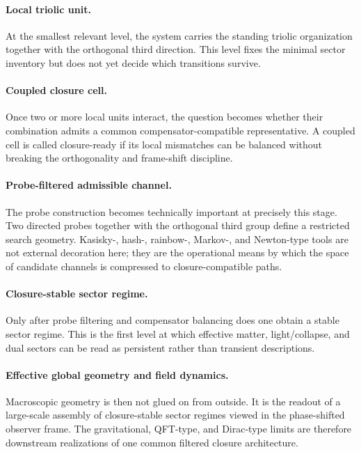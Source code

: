 \paragraph{Local triolic unit.}
At the smallest relevant level, the system carries the standing triolic
organization together with the orthogonal third direction. This level fixes the
minimal sector inventory but does not yet decide which transitions survive.

\paragraph{Coupled closure cell.}
Once two or more local units interact, the question becomes whether their
combination admits a common compensator-compatible representative. A coupled
cell is called closure-ready if its local mismatches can be balanced without
breaking the orthogonality and frame-shift discipline.

\paragraph{Probe-filtered admissible channel.}
The probe construction becomes technically important at precisely this stage.
Two directed probes together with the orthogonal third group define a restricted
search geometry. Kasisky-, hash-, rainbow-, Markov-, and Newton-type tools are
not external decoration here; they are the operational means by which the space
of candidate channels is compressed to closure-compatible paths.

\paragraph{Closure-stable sector regime.}
Only after probe filtering and compensator balancing does one obtain a stable
sector regime. This is the first level at which effective matter, light/collapse,
and dual sectors can be read as persistent rather than transient descriptions.

\paragraph{Effective global geometry and field dynamics.}
Macroscopic geometry is then not glued on from outside. It is the readout of a
large-scale assembly of closure-stable sector regimes viewed in the
phase-shifted observer frame. The gravitational, QFT-type, and Dirac-type
limits are therefore downstream realizations of one common filtered closure
architecture.

